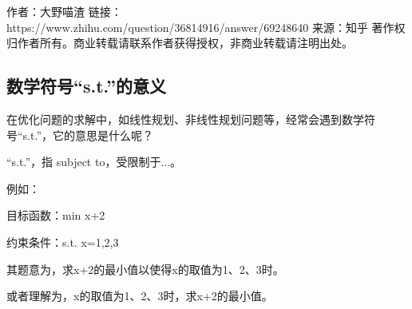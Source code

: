 \documentclass[UTF8]{ctexart}
\begin{document}
作者：大野喵渣
链接：https://www.zhihu.com/question/36814916/answer/69248640
来源：知乎
著作权归作者所有。商业转载请联系作者获得授权，非商业转载请注明出处。

\subsection{数学符号“s.t.”的意义}

在优化问题的求解中，如线性规划、非线性规划问题等，经常会遇到数学符号“s.t.”，它的意思是什么呢？

“s.t.”，指 subject to，受限制于...。

例如：

                目标函数：min {x+2}

                约束条件：s.t.  x={1,2,3}

其题意为，求x+2的最小值以使得x的取值为1、2、3时。

或者理解为，x的取值为1、2、3时，求x+2的最小值。
\end{document}
